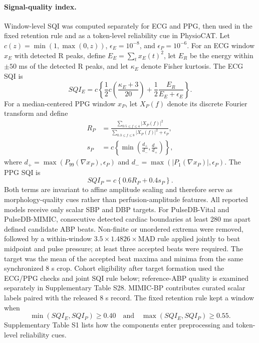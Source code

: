 \documentclass[11pt]{article}
\begin{document}
\paragraph{Signal-quality index.}
Window-level SQI was computed separately for ECG and PPG, then used in the fixed retention rule and as a token-level reliability cue in PhysioCAT. Let $c(z)=\min(1,\max(0,z))$, $\epsilon_E=10^{-8}$, and $\epsilon_P=10^{-6}$. For an ECG window $x_E$ with detected R peaks, define $E_E=\sum_t x_E(t)^2$, let $E_R$ be the energy within $\pm50$ ms of the detected R peaks, and let $\kappa_E$ denote Fisher kurtosis. The ECG SQI is
\begin{equation}
SQI_E
=c\left\{\frac{1}{2}c\left(\frac{\kappa_E+3}{20}\right)
+\frac{1}{2}\frac{E_R}{E_E+\epsilon_E}\right\}.
\end{equation}
For a median-centered PPG window $x_P$, let $X_P(f)$ denote its discrete Fourier transform and define
\begin{align}
R_P &= \frac{\sum_{0.5\leq f\leq4}|X_P(f)|^2}{\sum_{0.3\leq f\leq8}|X_P(f)|^2+\epsilon_P},\\
s_P &= c\left\{\min\left(\frac{d_+}{d_-},\frac{d_-}{d_+}\right)\right\},
\end{align}
where $d_+=\max(P_{99}(\nabla x_P),\epsilon_P)$ and $d_-=\max(|P_{1}(\nabla x_P)|,\epsilon_P)$. The PPG SQI is
\begin{equation}
SQI_P=c\left\{0.6R_P+0.4s_P\right\}.
\end{equation}
Both terms are invariant to affine amplitude scaling and therefore serve as morphology-quality cues rather than perfusion-amplitude features. All reported models receive only scalar SBP and DBP targets. For PulseDB-Vital and PulseDB-MIMIC, consecutive detected cardiac boundaries at least 280 ms apart defined candidate ABP beats. Non-finite or unordered extrema were removed, followed by a within-window $3.5\times1.4826\times\mathrm{MAD}$ rule applied jointly to beat midpoint and pulse pressure; at least three accepted beats were required. The target was the mean of the accepted beat maxima and minima from the same synchronized 8 s crop. Cohort eligibility after target formation used the ECG/PPG checks and joint SQI rule below; reference-ABP quality is examined separately in Supplementary Table S28. MIMIC-BP contributes curated scalar labels paired with the released 8 s record.
The fixed retention rule kept a window when
\begin{equation}
\min(SQI_E,SQI_P)\geq0.40
\quad\mathrm{and}\quad
\max(SQI_E,SQI_P)\geq0.55.
\end{equation}
Supplementary Table S1 lists how the components enter preprocessing and token-level reliability cues.
\end{document}
